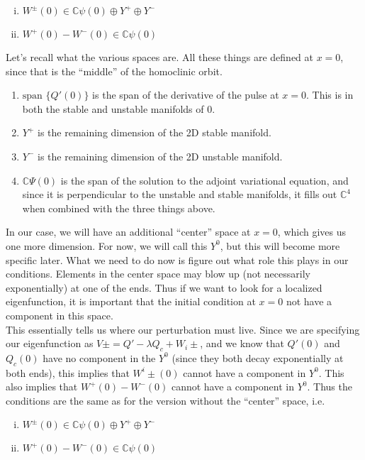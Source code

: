 \documentclass[12pt]{article}
\def\C{{\mathbb C}}
\begin{document}
\begin{enumerate}[(i)]
\item $W^\pm(0) \in \C \psi(0) \oplus Y^+ \oplus Y^-$
\item $W^+(0) - W^-(0) \in \C \psi(0) $
\end{enumerate}

Let's recall what the various spaces are. All these things are defined at $x = 0$, since that is the ``middle'' of the homoclinic orbit.

\begin{enumerate}
	\item $\text{span }\{Q'(0)\}$ is the span of the derivative of the pulse at $x = 0$. This is in both the stable and unstable manifolds of 0.
	\item $Y^+$ is the remaining dimension of the 2D stable manifold.
	\item $Y^-$ is the remaining dimension of the 2D unstable manifold.
	\item $\C \Psi(0)$ is the span of the solution to the adjoint variational equation, and since it is perpendicular to the unstable and stable manifolds, it fills out $\C^4$ when combined with the three things above.
\end{enumerate}

In our case, we will have an additional ``center'' space at $x = 0$, which gives us one more dimension. For now, we will call this $Y^0$, but this will become more specific later. What we need to do now is figure out what role this plays in our conditions. Elements in the center space may blow up (not necessarily exponentially) at one of the ends. Thus if we want to look for a localized eigenfunction, it is important that the initial condition at $x = 0$ not have a component in this space. \\

This essentially tells us where our perturbation must live. Since we are specifying our eigenfunction as $V\pm = Q' - \lambda Q_c + W_i\pm$, and we know that $Q'(0)$ and $Q_c(0)$ have no component in the $Y^0$ (since they both decay exponentially at both ends), this implies that $W^i\pm(0)$ cannot have a component in $Y^0$. This also implies that $W^+(0) - W^-(0)$ cannot have a component in $Y^0$. Thus the conditions are the same as for the version without the ``center'' space, i.e. 

\begin{enumerate}[(i)]
\item $W^\pm(0) \in \C \psi(0) \oplus Y^+ \oplus Y^-$
\item $W^+(0) - W^-(0) \in \C \psi(0) $
\end{enumerate}
\end{document}

